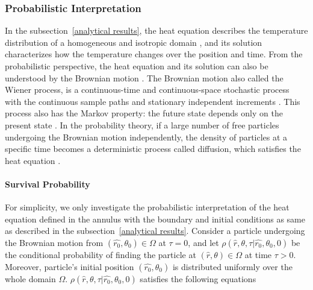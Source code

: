 \subsubsection{Probabilistic Interpretation}\label{probabilistic interpretation}

In the subsection~\ref{analytical results}, the heat equation
describes the temperature distribution of a homogeneous and isotropic
domain \cite{varadhan1980lectures}, and its solution characterizes how
the temperature changes over the position and time. From the
probabilistic perspective, the heat equation and its solution can also
be understood by the Brownian
motion \cite{brown1828microscopical}. The Brownian motion also called
the Wiener process, is a continuous-time and continuous-space
stochastic process \cite{karlin2014first} with the continuous sample
paths and stationary independent
increments \cite{ito2012diffusion}. This process also has the Markov
property: the future state depends only on the present
state \cite{bharucha2012elements}. In the probability theory, if a
large number of free particles undergoing the Brownian motion
independently, the density of particles at a specific time becomes a
deterministic process called diffusion, which satisfies the heat
equation \cite{kac1947random}\cite{varadhan1980lectures}.



\paragraph{Survival Probability}


\newcommand{\cpu}{\rho(\hat r, \theta, \tau | \hat{r_0}, \theta_0, 0)}
\newcommand{\cpuf}[1]{\ensuremath{\rho_{#1}}} 
\newcommand{\cpus}[2]{\ensuremath{\rho_{#1#2}}}
                                 

For simplicity, we only investigate the probabilistic interpretation
of the heat equation defined in the annulus with the boundary and
initial conditions as same as described in the
subsection~\ref{analytical results}. Consider a particle undergoing
the Brownian motion from $(\hat{r_0}, \theta_0) \in \Omega$ at
$\tau=0$, and let $\cpu$ be the conditional probability of finding the
particle at $(\hat r, \theta) \in \Omega$ at time $\tau>0$. Moreover,
particle's initial position $(\hat{r_0}, \theta_0)$ is distributed
uniformly over the whole domain $\Omega$. $\cpu$ satisfies the following
equations

